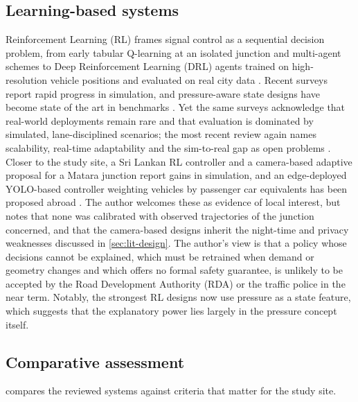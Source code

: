 \subsection{Learning-based systems}
Reinforcement Learning (RL) frames signal control as a sequential decision problem, from early tabular
Q-learning at an isolated junction \cite{abdulhai2003rl} and multi-agent schemes \cite{arel2010rl} to Deep
Reinforcement Learning (DRL) agents trained on high-resolution vehicle positions \cite{genders2016drl} and
evaluated on real city data \cite{wei2018intellilight}. Recent surveys \cite{wei2021recent,noaeen2022rl,
haydari2022deep} report rapid progress in simulation, and pressure-aware state designs have become state of the
art in benchmarks \cite{zhang2022expression}. Yet the same surveys acknowledge that real-world deployments
remain rare and that evaluation is dominated by simulated, lane-disciplined scenarios; the most recent review
again names scalability, real-time adaptability and the sim-to-real gap as open problems \cite{xiao2025advances}.
Closer to the study site, a Sri Lankan RL controller \cite{shangeeth2025emission} and a camera-based adaptive
proposal for a Matara junction \cite{wijesekara2025signals} report gains in simulation, and an edge-deployed
YOLO-based controller weighting vehicles by passenger car equivalents has been proposed abroad \cite{raza2025edgeatlc}. The
author welcomes these as evidence of local interest, but notes that none was calibrated with observed
trajectories of the junction concerned, and that the camera-based designs inherit the night-time and privacy
weaknesses discussed in \cref{sec:lit-design}. The author's view is that
a policy whose decisions cannot be explained, which must be retrained when demand or geometry changes and which
offers no formal safety guarantee, is unlikely to be accepted by the Road Development Authority (RDA) or the
traffic police in the near term. Notably, the strongest RL designs now use pressure as a state feature, which
suggests that the explanatory power lies largely in the pressure concept itself.

\subsection{Comparative assessment}
 compares the reviewed systems against criteria that matter for the study site.

